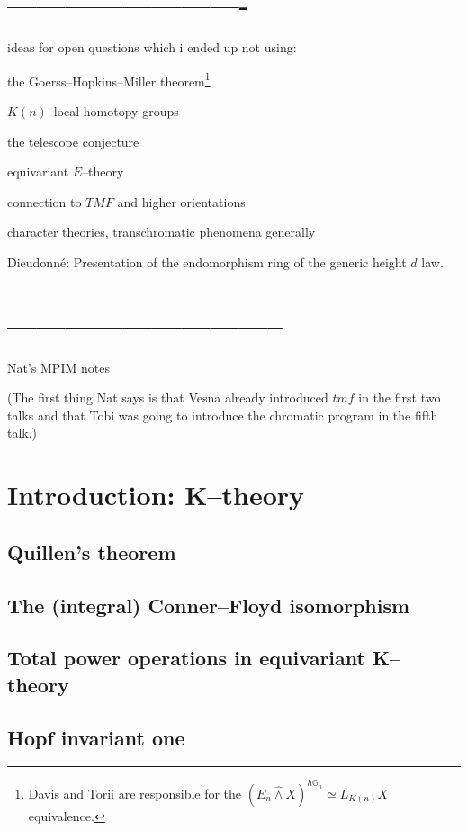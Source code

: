 \section{-------------------------}




ideas for open questions which i ended up not using:


the Goerss--Hopkins--Miller theorem\footnote{Davis and Torii are responsible for the $(E_n \hat\wedge X)^{h\mathbb G_n} \simeq L_{K(n)} X$ equivalence.}

$K(n)$--local homotopy groups

the telescope conjecture

equivariant $E$--theory

connection to $TMF$ and higher orientations

character theories, transchromatic phenomena generally

Dieudonn\'e: Presentation of the endomorphism ring of the generic height $d$ law.


\newpage
\section{-----------------------------}

Nat's MPIM notes

(The first thing Nat says is that Vesna already introduced $tmf$ in the first two talks and that Tobi was going to introduce the chromatic program in the fifth talk.)

\section{Introduction: K--theory}
    \subsection{Quillen's theorem}
    \subsection{The (integral) Conner--Floyd isomorphism}
    \subsection{Total power operations in equivariant K--theory}
    \subsection{Hopf invariant one}

